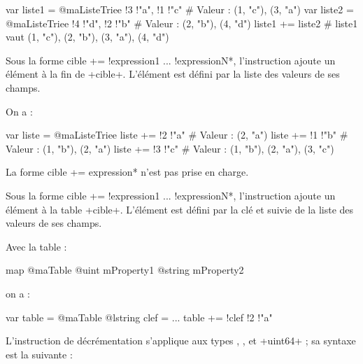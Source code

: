 \begin{galgas}
var liste1 = @maListeTriee {!3 !"a", !1 !"c"} # Valeur : (1, "c"), (3, "a")
var liste2 = @maListeTriee {!4 !"d", !2 !"b"} # Valeur : (2, "b"), (4, "d")
liste1 += liste2 # liste1 vaut (1, "c"), (2, "b"), (3, "a"), (4, "d")
\end{galgas}



Sous la forme \ggs*cible += !expression1 ... !expressionN*, l'instruction ajoute un élément à la fin de \ggs+cible+. L'élément est défini par la liste des valeurs de ses champs.


On a :

\begin{galgas}
var liste = @maListeTriee {}
liste += !2 !"a" # Valeur : (2, "a")
liste += !1 !"b" # Valeur : (1, "b"), (2, "a")
liste += !3 !"c" # Valeur : (1, "b"), (2, "a"), (3, "c")
\end{galgas}








La forme \ggs*cible += expression* n'est pas prise en charge.

Sous la forme \ggs*cible += !expression1 ... !expressionN*, l'instruction ajoute un élément à la table \ggs+cible+. L'élément est défini par la clé et suivie de la liste des valeurs de ses champs.


Avec la table :
\begin{galgas}
map @maTable {
  @uint mProperty1
  @string mProperty2
}
\end{galgas}

on a :

\begin{galgas}
var table = @maTable {}
@lstring clef = ...
table += !clef !2 !"a"
\end{galgas}















L'instruction de décrémentation s'applique aux types , ,  et \ggs+uint64+ ; sa syntaxe est la suivante :

